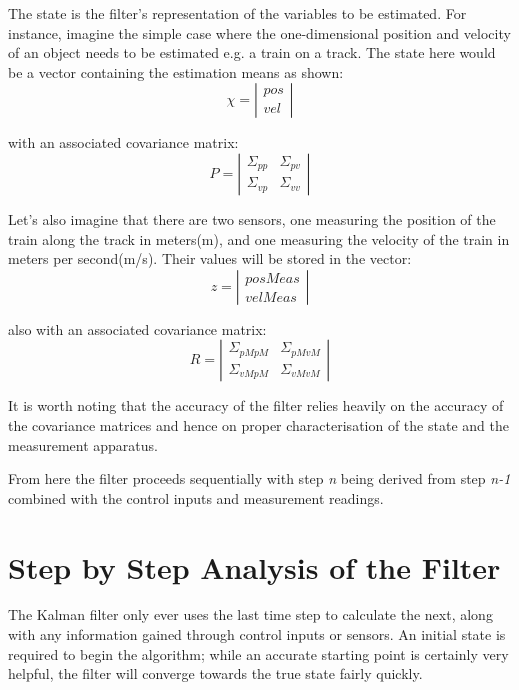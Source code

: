 \documentclass[12pt]{article}
\begin{document}
	The state is the filter's representation of the variables to be estimated. For instance, imagine the simple case where the one-dimensional position and velocity of an object needs to be estimated e.g. a train on a track. The state here would be a vector containing the estimation means as shown:
\[\chi 
=
\left |  \begin{array}{c}
pos \\
vel
\end{array}  \right |\]

with an associated covariance matrix:
\[ P 
= 
\left |  \begin{array}{cc}
\Sigma_{pp} & \Sigma_{pv} \\
\Sigma_{vp} & \Sigma_{vv}
\end{array}  \right |\]


Let's also imagine that there are two sensors, one measuring the position of the train along the track in meters(m), and one measuring the velocity of the train in meters per second(m/s). Their values will be stored in the vector:
\[z 
=
\left |  \begin{array}{c}
posMeas \\
velMeas
\end{array}  \right |\]

also with an associated covariance matrix:
\[R 
= 
\left |  \begin{array}{cc}
\Sigma_{pMpM} & \Sigma_{pMvM} \\
\Sigma_{vMpM} & \Sigma_{vMvM}
\end{array}  \right |\]

It is worth noting that the accuracy of the filter relies heavily on the accuracy of the covariance matrices and hence on proper characterisation of the state and the measurement apparatus.\par
From here the filter proceeds sequentially with step \textit{n} being derived from step \textit{n-1} combined with the control inputs and measurement readings.

\section{Step by Step Analysis of the Filter}
The Kalman filter only ever uses the last time step to calculate the next, along with any information gained through control inputs or sensors. An initial state is required to begin the algorithm; while an accurate starting point is certainly very helpful, the filter will converge towards the true state fairly quickly.
\end{document}
